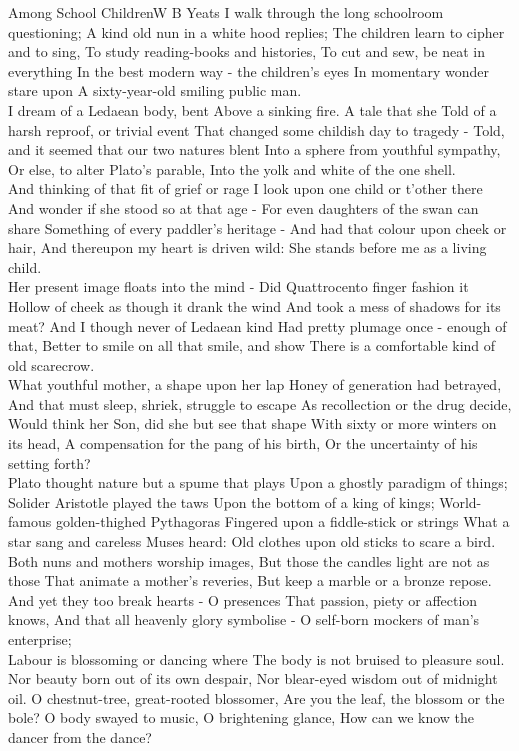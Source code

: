 \begin{poem}{Among School Children}{W B Yeats}
I walk through the long schoolroom questioning;
A kind old nun in a white hood replies;
The children learn to cipher and to sing,
To study reading-books and histories,
To cut and sew, be neat in everything
In the best modern way - the children's eyes
In momentary wonder stare upon
A sixty-year-old smiling public man.\\

I dream of a Ledaean body, bent
Above a sinking fire. A tale that she
Told of a harsh reproof, or trivial event
That changed some childish day to tragedy -
Told, and it seemed that our two natures blent
Into a sphere from youthful sympathy,
Or else, to alter Plato's parable,
Into the yolk and white of the one shell.\\

And thinking of that fit of grief or rage
I look upon one child or t'other there
And wonder if she stood so at that age -
For even daughters of the swan can share
Something of every paddler's heritage -
And had that colour upon cheek or hair,
And thereupon my heart is driven wild:
She stands before me as a living child.\\

Her present image floats into the mind -
Did Quattrocento finger fashion it
Hollow of cheek as though it drank the wind
And took a mess of shadows for its meat?
And I though never of Ledaean kind
Had pretty plumage once - enough of that,
Better to smile on all that smile, and show
There is a comfortable kind of old scarecrow.\\

What youthful mother, a shape upon her lap
Honey of generation had betrayed,
And that must sleep, shriek, struggle to escape
As recollection or the drug decide,
Would think her Son, did she but see that shape
With sixty or more winters on its head,
A compensation for the pang of his birth,
Or the uncertainty of his setting forth?\\

Plato thought nature but a spume that plays
Upon a ghostly paradigm of things;
Solider Aristotle played the taws
Upon the bottom of a king of kings;
World-famous golden-thighed Pythagoras
Fingered upon a fiddle-stick or strings
What a star sang and careless Muses heard:
Old clothes upon old sticks to scare a bird.\\

Both nuns and mothers worship images,
But those the candles light are not as those
That animate a mother's reveries,
But keep a marble or a bronze repose.
And yet they too break hearts - O presences
That passion, piety or affection knows,
And that all heavenly glory symbolise -
O self-born mockers of man's enterprise;\\

Labour is blossoming or dancing where
The body is not bruised to pleasure soul.
Nor beauty born out of its own despair,
Nor blear-eyed wisdom out of midnight oil.
O chestnut-tree, great-rooted blossomer,
Are you the leaf, the blossom or the bole?
O body swayed to music, O brightening glance,
How can we know the dancer from the dance? \\
\end{poem}


